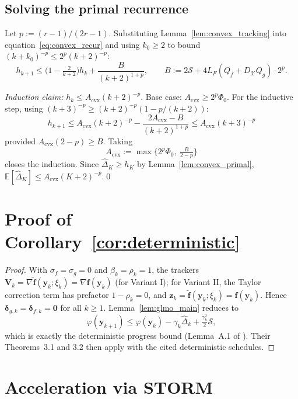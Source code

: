 \documentclass{article}
\def\eqref#1{equation~\ref{#1}}
\newcommand{\cX}{\mathcal{X}}
\def\vf{{\bm{f}}}
\def\vy{{\bm{y}}}
\def\vz{{\bm{z}}}
\def\mV{{\bm{V}}}
\newcommand{\E}{\mathbb{E}}
\begin{document}
\subsection{Solving the primal recurrence}

Let $p := (r-1)/(2r-1)$. Substituting Lemma~\ref{lem:convex_tracking} into \eqref{eq:convex_recur} and using $k_0 \ge 2$ to bound $(k+k_0)^{-p} \le 2^p (k+2)^{-p}$:
\[
h_{k+1} \le \big(1 - \tfrac{2}{k+2}\big) h_k + \frac{B}{(k+2)^{1+p}}, \qquad B := 2\mathcal{S} + 4 L_F (Q_f + D_\cX Q_g)\cdot 2^p.
\]

\emph{Induction claim:} $h_k \le A_{\mathrm{cvx}}(k+2)^{-p}$. Base case: $A_{\mathrm{cvx}} \ge 2^p \Phi_0$. For the inductive step, using $(k+3)^{-p} \ge (k+2)^{-p}(1 - p/(k+2))$:
\[
h_{k+1} \le A_{\mathrm{cvx}}(k+2)^{-p} - \frac{2A_{\mathrm{cvx}} - B}{(k+2)^{1+p}} \le A_{\mathrm{cvx}}(k+3)^{-p}
\]
provided $A_{\mathrm{cvx}}(2-p) \ge B$. Taking
\begin{equation}\label{eq:Acvx_def}
\boxed{A_{\mathrm{cvx}} := \max\Big\{2^p \Phi_0,\ \tfrac{B}{2-p}\Big\}}
\end{equation}
closes the induction. Since $\hat\Delta_K \ge h_K$ by Lemma~\ref{lem:convex_primal}, $\E[\hat\Delta_K] \le A_{\mathrm{cvx}}(K+2)^{-p}$.\hfill\qed

\section{Proof of Corollary~\ref{cor:deterministic}} \label{sec:proof_deterministic}

\begin{proof}
With $\sigma_f = \sigma_g = 0$ and $\beta_k = \rho_k = 1$, the trackers $\mV_k = \nabla\tilde\vf(\vy_k; \xi_k) = \nabla\vf(\vy_k)$ (for Variant I); for Variant II, the Taylor correction term has prefactor $1 - \rho_k = 0$, and $\vz_k = \tilde\vf(\vy_k; \xi_k) = \vf(\vy_k)$. Hence $\bm\delta_{g,k} = \bm\delta_{f,k} = \mathbf{0}$ for all $k \ge 1$. Lemma~\ref{lem:glmo_main} reduces to
\[
\varphi(\vy_{k+1}) \le \varphi(\vy_k) - \gamma_k \hat\Delta_k + \tfrac{\gamma_k^2}{2}\mathcal{S},
\]
which is exactly the deterministic progress bound (Lemma~A.1 of \citet{vladarean2023first}). Their Theorems~3.1 and 3.2 then apply with the cited deterministic schedules.
\end{proof}

\section{Acceleration via STORM} \label{sec:storm_extension}
\end{document}
